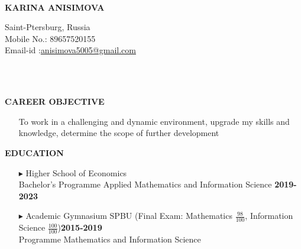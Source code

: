 \documentclass[a4paper,10pt]{article}
\begin{document}
	\hspace{0.5cm}\\[-0.2cm]
	\begin{minipage}{0.5\textwidth}
		\begin{flushleft}
			\huge \textbf{\* \* KARINA ANISIMOVA} 
			\normalsize
		\end{flushleft}
	\end{minipage}
	\begin{minipage}{0.51\textwidth}
		\begin{flushright}
			\textcolor[gray]{0.3}{
				\indent Saint-Ptersburg, Russia\\
				\indent Mobile No.: 89657520155  \\
				\indent Email-id :\href{mailto:anisimova5005@gmail.com} {anisimova5005@gmail.com}\\  	
			}
		\end{flushright}
	\end{minipage}
	\\ \\
	
	
	\colorbox{magicmint}{
		\begin{minipage}{0.96\textwidth}
			\textbf{CAREER OBJECTIVE}
		\end{minipage}
	}
	\begin{itemize}
		\item[]To work in a challenging and dynamic environment, upgrade my skills and knowledge, determine the scope of further development
	\end{itemize}
	
	\colorbox{magicmint}{
		\begin{minipage}{0.96\textwidth}
			\textbf{EDUCATION}
		\end{minipage}
	}
	
	\begin{itemize}
		\item [$\blacktriangleright$]  Higher School of Economics\\ Bachelor’s Programme Applied Mathematics and Information Science \hspace{3.9cm} \textbf{2019-2023}
		\item[$\blacktriangleright$]  Academic Gymnasium SPBU (Final Exam: Mathematics $\frac{98}{100}$, Information Science $\frac{100}{100}$)\hspace{1.7cm}\textbf{2015-2019} \\ Programme Mathematics and Information Science 
	\end{itemize}
\end{document}
